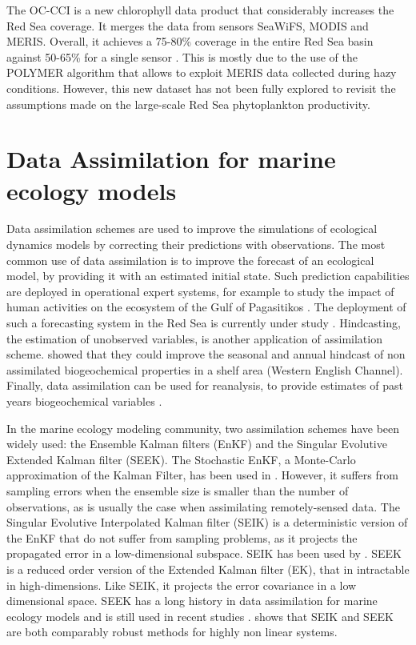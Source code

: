The OC-CCI is a new chlorophyll data product that considerably increases the Red Sea coverage. It merges the data from sensors SeaWiFS, MODIS and MERIS. Overall, it achieves a 75-80\% coverage in the entire Red Sea basin against 50-65\% for a single sensor \cite{Racault}. This is mostly due to the use of the POLYMER algorithm \cite{Steinmetz2011} that allows to exploit MERIS data collected during hazy conditions. However, this new dataset has not been fully explored to revisit the assumptions made on the large-scale Red Sea phytoplankton productivity.

\section{Data Assimilation for marine ecology models}

Data assimilation schemes are used to improve the simulations of ecological dynamics models by correcting their predictions with observations. The most common use of data assimilation is to improve the forecast of an ecological model, by providing it with an estimated initial state. Such prediction capabilities are deployed in operational expert systems, for example to study the impact of human activities on the ecosystem of the Gulf of Pagasitikos \cite{Korres2012}. The deployment of such a forecasting system in the Red Sea is currently under study \cite{Triantafyllou2014}. Hindcasting, the estimation of unobserved variables, is another application of assimilation scheme. \cite{Ciavatta2011}  showed that they could improve the seasonal and annual hindcast of non assimilated biogeochemical properties in a shelf area (Western English Channel). Finally, data assimilation can be used for reanalysis, to provide estimates of past years biogeochemical variables \cite{Fontana2013}. 

In the marine ecology modeling community, two assimilation schemes have been widely used: the Ensemble Kalman filters (EnKF) and the Singular Evolutive Extended Kalman filter (SEEK). The Stochastic EnKF, a Monte-Carlo approximation of the Kalman Filter, has been used in \cite{Ciavatta2011, Ciavatta2014}. However, it suffers from sampling errors when the ensemble size is smaller than the number of observations, as is usually the case when assimilating remotely-sensed data. The Singular Evolutive Interpolated Kalman filter (SEIK) is a deterministic version of the EnKF that do not suffer from sampling problems, as it projects the propagated error in a low-dimensional subspace. SEIK has been used by \cite{Triantafyllou2012, Korres2012}. SEEK is a reduced order version of the Extended Kalman filter (EK), that in intractable in high-dimensions. Like SEIK, it projects the error covariance in a low dimensional space. SEEK has a long history in data assimilation for marine ecology models and is still used in recent studies \cite{Fontana2013, Korres2012, Butenschon2012}. \cite{Korres2012} shows that SEIK and SEEK are both comparably robust methods for highly non linear systems.


